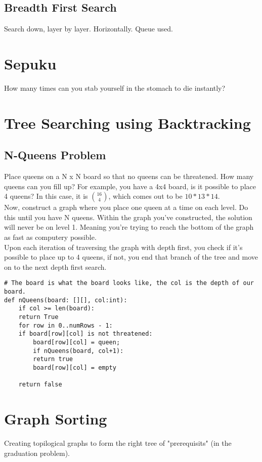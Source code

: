 \documentclass{article}
\begin{document}
\subsection{Breadth First Search}
\label{sec:org650e565}
Search down, layer by layer. Horizontally. Queue used.

\section{Sepuku}
\label{sec:org702eb04}
How many times can you stab yourself in the stomach to die instantly?

\section{Tree Searching using Backtracking}
\label{sec:orgd78e407}
\subsection{N-Queens Problem}
\label{sec:org645beff}
Place queens on a N x N board so that no queens can be threatened. How many queens can you fill up?
For example, you have a 4x4 board, is it possible to place 4 queens? In this case, it is \({16 \choose 4}\), which comes out to be \(10 * 13 * 14\). \\

Now, construct a graph where you place one queen at a time on each level. Do this until you have N queens. Within the graph you've constructed, the solution will never be on level 1. Meaning you're trying to reach the bottom of the graph as fast as computery possible.\\

Upon each iteration of traversing the graph with depth first, you check if it's possible to place up to 4 queens, if not, you end that branch of the tree and move on to the next depth first search.

\begin{verbatim}
# The board is what the board looks like, the col is the depth of our board.
def nQueens(board: [][], col:int):
    if col >= len(board):
	return True
    for row in 0..numRows - 1:
	if board[row][col] is not threatened:
	    board[row][col] = queen;
	    if nQueens(board, col+1):
		return true
	    board[row][col] = empty

    return false
\end{verbatim}

\section{Graph Sorting}
\label{sec:org519d436}
Creating topilogical graphs to form the right tree of "prerequisits" (in the graduation problem).
\end{document}
